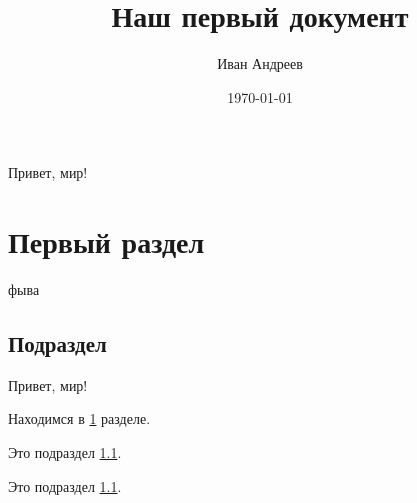 \documentclass[a4paper,12pt]{article}
\author{Иван Андреев}
\title{Наш первый документ}
\date{\today}
\begin{document}
	
\maketitle
	
Привет, мир!
	
\section{Первый раздел}\label{razd}
	
фыва
	
\subsection{Подраздел}\label{podrazd}

Привет, мир!

Находимся в \ref{razd} разделе.

Это подраздел \ref{podrazd}.
	
Это подраздел \ref{podrazd}.
	
\end{document}
